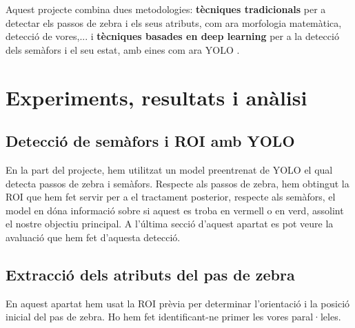 \documentclass[10pt,a4paper,twocolumn,twoside]{article}
\begin{document}
 Aquest projecte combina dues metodologies: \textbf{tècniques tradicionals} per a detectar els passos de zebra i els seus atributs, com ara morfologia matemàtica, detecció de vores,... i \textbf{tècniques basades en deep learning} per a la detecció dels semàfors i el seu estat, amb eines com ara YOLO \cite{YOLO}.
 
\section{Experiments, resultats i anàlisi}

\subsection{Detecció de semàfors i ROI amb YOLO}
En la part del projecte, hem utilitzat un model preentrenat de YOLO el qual detecta passos de zebra i semàfors. Respecte als passos de zebra, hem obtingut la ROI que hem fet servir per a el tractament posterior, respecte als semàfors, el model en dóna informació sobre si aquest es troba en vermell o en verd, assolint el nostre objectiu principal. A l'última secció d'aquest apartat es pot veure la avaluació que hem fet d'aquesta detecció.

\subsection{Extracció dels atributs del pas de zebra}

En aquest apartat hem usat la ROI prèvia per determinar l’orientació i la posició inicial del pas de zebra. Ho hem fet identificant-ne primer les vores paral·leles.
\end{document}
